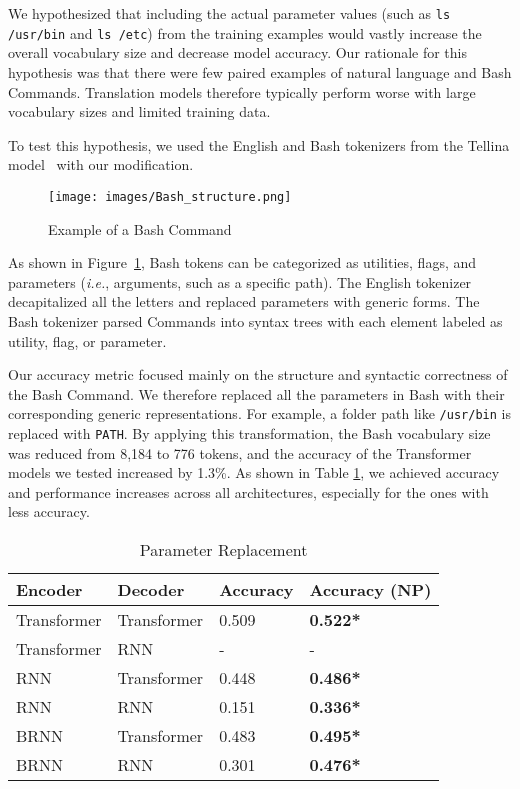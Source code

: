 \documentclass{river-journal}
\begin{document}
We hypothesized that including the actual parameter values (such as \texttt{ls /usr/bin} and \texttt{ls /etc}) from the training examples would vastly increase the overall vocabulary size and decrease model accuracy. Our rationale for this hypothesis was that there were few paired examples of natural language and Bash Commands. Translation models therefore typically perform worse with large vocabulary sizes and limited training data. 

To test this hypothesis, we used the English and Bash tokenizers from the Tellina model~\cite{Lin2017ProgramSF} with our modification. 
\begin{figure}[hbt]
    \centering
    \texttt{[image: images/Bash\_structure.png]}
    \caption{Example of a Bash Command}
    \label{fig:Bash_structure}
\end{figure}
As shown in Figure~\ref{fig:Bash_structure}, Bash tokens can be categorized as utilities, flags, and parameters (\textit{i.e.}, arguments, such as a specific path). The English tokenizer decapitalized all the letters and replaced parameters with generic forms. The Bash tokenizer parsed Commands into syntax trees with each element labeled as utility, flag, or parameter. 

Our accuracy metric focused mainly on the structure and syntactic correctness of the Bash Command. We therefore replaced all the parameters in Bash with their corresponding generic representations. For example, a folder path like \texttt{/usr/bin} is replaced with \texttt{PATH}. By applying this transformation, the Bash vocabulary size was reduced from 8,184 to 776 tokens, and the accuracy of the Transformer models we tested increased by 1.3\%. As shown in Table \ref{table:parameter}, we achieved accuracy and performance increases across all architectures, especially for the ones with less accuracy.

\begin{table}[bhtp]
\caption{\label{table:parameter} Parameter Replacement}
\centering
\begin{tabular}{llll}
\hline 
\textbf {Encoder}  & \textbf{Decoder} & \textbf{Accuracy} & \textbf {Accuracy (NP)}\\
\hline
Transformer & Transformer & 0.509 & \textbf {0.522*} \\
\hline
Transformer & RNN & - & - \\
\hline
RNN & Transformer & 0.448 & \textbf {0.486*} \\
\hline
RNN & RNN & 0.151 & \textbf {0.336*} \\
\hline
BRNN & Transformer & 0.483 & \textbf {0.495*} \\
\hline
BRNN & RNN & 0.301 & \textbf {0.476*} \\
\hline
\end{tabular}
\end{table}
\end{document}
